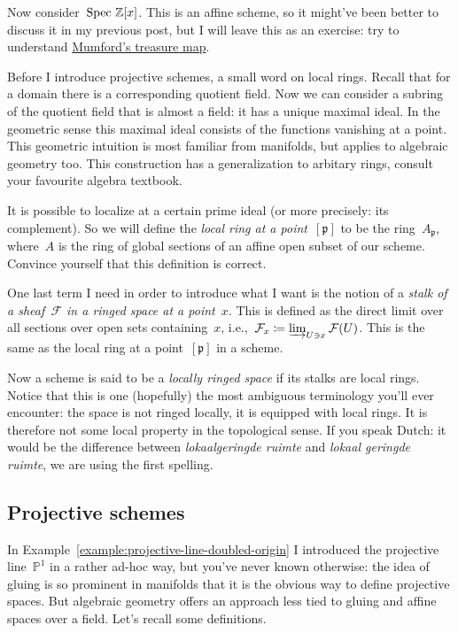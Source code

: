 \begin{example}
  Now consider~$\operatorname{Spec\,}\mathbb{Z}[x]$. This is an affine scheme, so it might've been better to discuss it in my previous post, but I will leave this as an exercise: try to understand \href{http://www.neverendingbooks.org/index.php/mumfords-treasure-map.html}{Mumford's treasure map}.
\end{example}

Before I introduce projective schemes, a small word on local rings. Recall that for a domain there is a corresponding quotient field. Now we can consider a subring of the quotient field that is almost a field: it has a unique maximal ideal. In the geometric sense this maximal ideal consists of the functions vanishing at a point. This geometric intuition is most familiar from manifolds, but applies to algebraic geometry too. This construction has a generalization to arbitary rings, consult your favourite algebra textbook.

It is possible to localize at a certain prime ideal (or more precisely: its complement). So we will define the \emph{local ring at a point~$[\mathfrak{p}]$} to be the ring~$A_{\mathfrak{p}}$, where~$A$ is the ring of global sections of an affine open subset of our scheme. Convince yourself that this definition is correct.

One last term I need in order to introduce what I want is the notion of a \emph{stalk of a sheaf~$\mathcal{F}$ in a ringed space at a point~$x$}. This is defined as the direct limit over all sections over open sets containing~$x$, i.e.,~$\mathcal{F}_x\coloneqq\varinjlim_{U\ni x}\mathcal{F}(U)$. This is the same as the local ring at a point~$[\mathfrak{p}]$ in a scheme.

Now a scheme is said to be a \emph{locally ringed space} if its stalks are local rings. Notice that this is one (hopefully) the most ambiguous terminology you'll ever encounter: the space is not ringed locally, it is equipped with local rings. It is therefore not some local property in the topological sense. If you speak Dutch: it would be the difference between \emph{lokaalgeringde ruimte} and \emph{lokaal geringde ruimte}, we are using the first spelling.


\subsection{Projective schemes}

In Example~\ref{example:projective-line-doubled-origin} I introduced the projective line~$\mathbb{P}^1$ in a rather ad-hoc way, but you've never known otherwise: the idea of gluing is so prominent in manifolds that it is the obvious way to define projective spaces. But algebraic geometry offers an approach less tied to gluing and affine spaces over a field. Let's recall some definitions.

